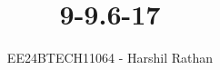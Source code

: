 \documentclass[journal]{IEEEtran}
\begin{document}

\vspace{3cm}

\title{9-9.6-17}
\author{EE24BTECH11064 - Harshil Rathan}
 \maketitle
{\let\newpage\relax\maketitle}

\renewcommand{\thefigure}{\theenumi}
\renewcommand{\thetable}{\theenumi}
\setlength{\intextsep}{10pt} %


\renewcommand{\thetable}{\theenumi}
\end{document}
